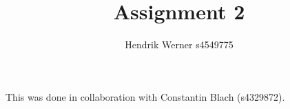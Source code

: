 \documentclass[12pt]{article}
\title {Assignment 2}
\author {Hendrik Werner s4549775}
\begin{document}
\maketitle

This was done in collaboration with Constantin Blach (s4329872).

\section{} %
\section{} %
\section{} %
\section{} %
\section{} %
\section{} %
\end{document}

